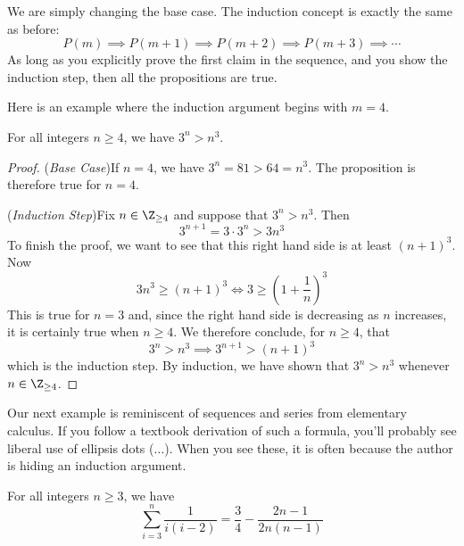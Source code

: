 We are simply changing the base case. The induction concept is exactly the same as before:
\[
	P(m)\implies P(m+1)\implies P(m+2)\implies P(m+3)\implies\cdots
\]
As long as you explicitly prove the first claim in the sequence, and you show the induction step, then all the propositions are true.\par


Here is an example where the induction argument begins with $m=4$.

\begin{thm}{}{}
	For all integers $n\ge 4$, we have $3^n>n^3$.
\end{thm}

\begin{proof}
	(\emph{Base Case})\quad If $n=4$, we have $3^n=81>64=n^3$. The proposition is therefore true for $n=4$.\par
	(\emph{Induction Step})\quad Fix $n\in\Z_{\ge 4}$ and suppose that $3^n>n^3$. Then
	\[
		3^{n+1}=3\cdot 3^n>3n^3
	\]
	To finish the proof, we want to see that this right hand side is at least $(n+1)^3$. Now
	\[
		3n^3\ge(n+1)^3\iff 3\ge\left(1+\frac 1n\right)^3
	\]
	This is true for $n=3$ and, since the right hand side is decreasing as $n$ increases, it is certainly true  when $n\ge 4$. We therefore conclude, for $n\ge 4$, that
	\[
		3^n>n^3\implies 3^{n+1}>(n+1)^3
	\]
	which is the induction step. By induction, we have shown that $3^n>n^3$ whenever $n\in\Z_{\ge 4}$.
\end{proof}


Our next example is reminiscent of sequences and series from elementary calculus. If you follow a textbook derivation of such a formula, you'll probably see liberal use of ellipsis dots ($\ldots$). When you see these, it is often because the author is hiding an induction argument.

\begin{thm}{}{}
	For all integers $n\ge 3$, we have
	\[
		\sum\limits_{i=3}^n\frac 1{i(i-2)}=\frac 34-\frac{2n-1}{2n(n-1)}\tag{$\ast$}
	\]
\end{thm}

